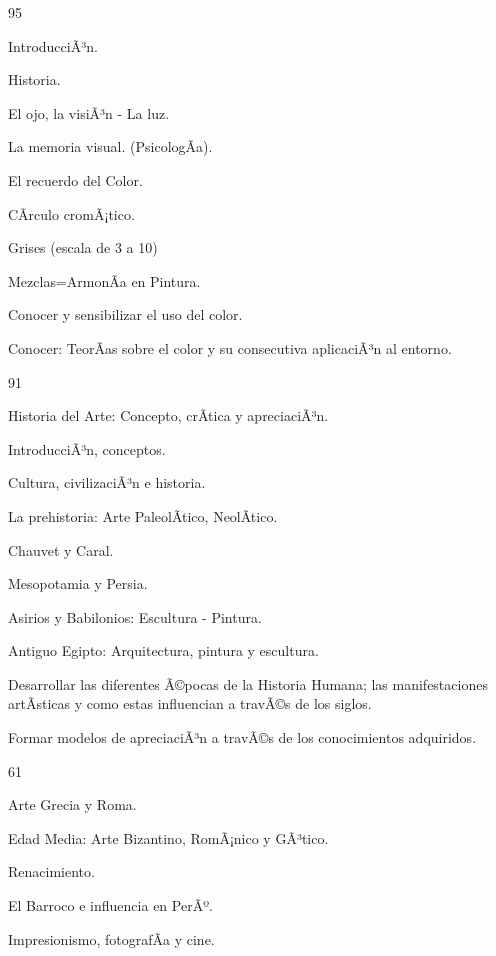 \begin{syllabus}
\begin{unit}{}{}{9}{5}
\begin{topics}
	\item IntroducciÃ³n.
	\item Historia.
	\item El ojo, la visiÃ³n - La luz.
	\item La memoria visual. (PsicologÃ­a).
	\item El recuerdo del Color.
	\item CÃ­rculo cromÃ¡tico.
	\item Grises (escala de 3 a 10)
	\item Mezclas=ArmonÃ­a en Pintura.
\end{topics}
\begin{unitgoals}
	\item Conocer y sensibilizar el uso del color.
	\item Conocer: TeorÃ­as sobre el color y su consecutiva aplicaciÃ³n al entorno.
\end{unitgoals}
\end{unit}

\begin{unit}{}{}{9}{1}
\begin{topics}
	\item Historia del Arte: Concepto, crÃ­tica y apreciaciÃ³n.
	\item IntroducciÃ³n, conceptos.
	\item Cultura, civilizaciÃ³n e historia.
	\item La prehistoria: Arte PaleolÃ­tico, NeolÃ­tico.
	\item Chauvet y Caral.
	\item Mesopotamia y Persia.
	\item Asirios y Babilonios: Escultura - Pintura.
	\item Antiguo Egipto: Arquitectura, pintura y escultura.
\end{topics}
\begin{unitgoals}
	\item Desarrollar las diferentes Ã©pocas de la Historia Humana; las manifestaciones artÃ­sticas y como estas influencian a travÃ©s de los siglos.
	\item Formar modelos de apreciaciÃ³n a travÃ©s de los conocimientos adquiridos.
\end{unitgoals}
\end{unit}

\begin{unit}{}{}{6}{1}
\begin{topics}
	\item Arte Grecia y Roma.
	\item Edad Media: Arte Bizantino, RomÃ¡nico y GÃ³tico.
	\item Renacimiento.
	\item El Barroco e influencia en PerÃº.
	\item Impresionismo, fotografÃ­a y cine.
\end{topics}


\end{unit}
\end{syllabus}
